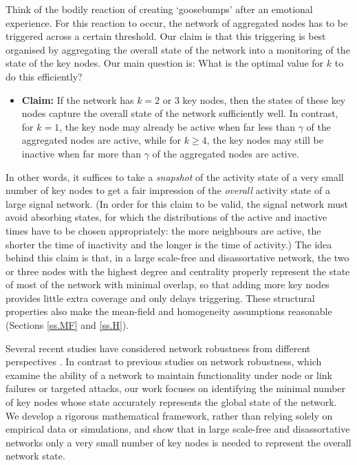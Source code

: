 \documentclass[11pt]{article}
\numberwithin{equation}{section}
\begin{document}
Think of the bodily reaction of creating `goosebumps' after an emotional experience. For this reaction to occur, the network of aggregated nodes has to be triggered across a certain threshold. Our claim is that this triggering is best organised by aggregating the overall state of the network into a monitoring of the state of the key nodes. Our main question is: What is the optimal value for $k$ to do this efficiently?
\begin{itemize}
\item 
\textbf{Claim:} If the network has $k=2$ or $3$ key nodes, then the states of these key nodes capture the overall state of the network sufficiently well. In contrast, for $k=1$, the key node may already be active when far less than $\gamma$ of the aggregated nodes are active, while for $k \geq 4$, the key nodes may still be inactive when far more than $\gamma$ of the aggregated nodes are active.
\end{itemize} 
In other words, it suffices to take a \emph{snapshot} of the activity state of a very small number of key nodes to get a fair impression of the \emph{overall} activity state of a large signal network. (In order for this claim to be valid, the signal network must avoid absorbing states, for which the distributions of the active and inactive times have to be chosen appropriately: the more neighbours are active, the shorter the time of inactivity and the longer is the time of activity.) The idea behind this claim is that, in a large scale-free and disassortative network, the two or three nodes with the highest degree and centrality properly represent the state of most of the network with minimal overlap, so that adding more key nodes provides little extra coverage and only delays triggering. These structural properties also make the mean-field and homogeneity assumptions reasonable (Sections \ref{ss.MF} and \ref{ss.H}).

Several recent studies have considered network robustness from different perspectives \cite{new-ref1, new-ref2, new-ref3, new-ref4}. In contrast to previous studies on network robustness, which examine the ability of a network to maintain functionality under node or link failures or targeted attacks, our work focuses on identifying the minimal number of key nodes whose state accurately represents the global state of the network. We develop a rigorous mathematical framework, rather than relying solely on empirical data or simulations, and show that in large scale-free and disassortative networks only a very small number of key nodes is needed to represent the overall network state. 
\end{document}

